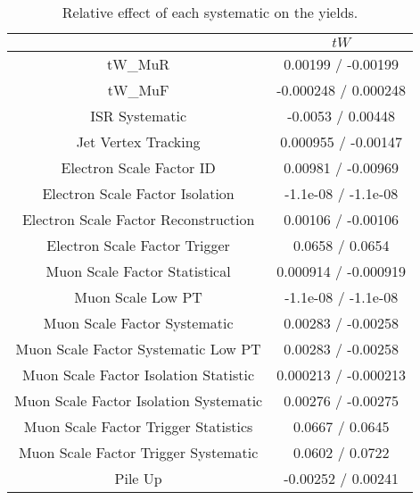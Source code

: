\documentclass[10pt]{article}
\begin{document}
\begin{table}[htbp]
\begin{center}
\begin{tabular}{|c|c|}
\hline 
      & $tW$ \\ 
\hline 
  tW_MuR & 0.00199 / -0.00199 \\ 
  tW_MuF & -0.000248 / 0.000248 \\ 
  ISR Systematic & -0.0053 / 0.00448 \\ 
  Jet Vertex Tracking & 0.000955 / -0.00147 \\ 
  Electron Scale Factor ID & 0.00981 / -0.00969 \\ 
  Electron Scale Factor Isolation & -1.1e-08 / -1.1e-08 \\ 
  Electron Scale Factor Reconstruction & 0.00106 / -0.00106 \\ 
  Electron Scale Factor Trigger & 0.0658 / 0.0654 \\ 
  Muon Scale Factor Statistical & 0.000914 / -0.000919 \\ 
  Muon Scale Low PT & -1.1e-08 / -1.1e-08 \\ 
  Muon Scale Factor Systematic & 0.00283 / -0.00258 \\ 
  Muon Scale Factor Systematic Low PT & 0.00283 / -0.00258 \\ 
  Muon Scale Factor Isolation Statistic & 0.000213 / -0.000213 \\ 
  Muon Scale Factor Isolation Systematic & 0.00276 / -0.00275 \\ 
  Muon Scale Factor Trigger Statistics & 0.0667 / 0.0645 \\ 
  Muon Scale Factor Trigger Systematic & 0.0602 / 0.0722 \\ 
  Pile Up & -0.00252 / 0.00241 \\ 
\hline 
\end{tabular} 
\caption{Relative effect of each systematic on the yields.} 
\end{center} 
\end{table} 
\end{document}
